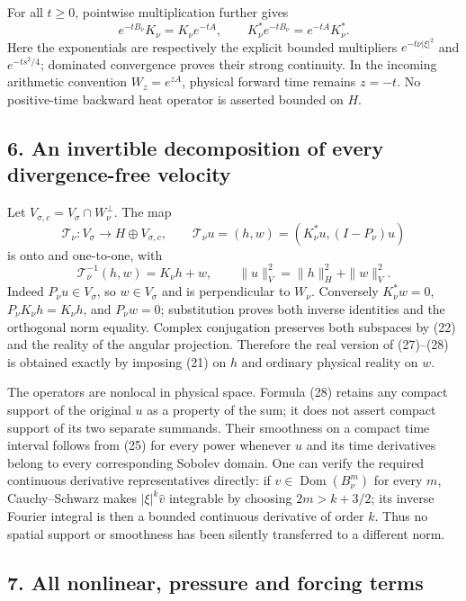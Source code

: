 For all \(t\ge0\), pointwise multiplication further gives \[
e^{-tB_\nu}K_\nu=K_\nu e^{-tA},\qquad
K_\nu^*e^{-tB_\nu}=e^{-tA}K_\nu^*.
\tag{26}
\] Here the exponentials are respectively the explicit bounded multipliers \(e^{-t\nu|\xi|^2}\) and \(e^{-ts^2/4}\); dominated convergence proves their strong continuity. In the incoming arithmetic convention \(W_z=e^{zA}\), physical forward time remains \(z=-t\). No positive-time backward heat operator is asserted bounded on \(H\).

\subsection*{6. An invertible decomposition of every divergence-free velocity}

Let \(V_{\sigma,c}=V_\sigma\cap W_\nu^\perp\). The map \[
\mathcal T_\nu:V_\sigma\longrightarrow H\oplus V_{\sigma,c},\qquad
\mathcal T_\nu u=(h,w)=(K_\nu^*u,(I-P_\nu)u)
\tag{27}
\] is onto and one-to-one, with \[
\mathcal T_\nu^{-1}(h,w)=K_\nu h+w,
\qquad\|u\|_V^2=\|h\|_H^2+\|w\|_V^2.
\tag{28}
\] Indeed \(P_\nu u\in V_\sigma\), so \(w\in V_\sigma\) and is perpendicular to \(W_\nu\). Conversely \(K_\nu^*w=0\), \(P_\nu K_\nu h=K_\nu h\), and \(P_\nu w=0\); substitution proves both inverse identities and the orthogonal norm equality. Complex conjugation preserves both subspaces by (22) and the reality of the angular projection. Therefore the real version of (27)--(28) is obtained exactly by imposing (21) on \(h\) and ordinary physical reality on \(w\).

The operators are nonlocal in physical space. Formula (28) retains any compact support of the original \(u\) as a property of the sum; it does not assert compact support of its two separate summands. Their smoothness on a compact time interval follows from (25) for every power whenever \(u\) and its time derivatives belong to every corresponding Sobolev domain. One can verify the required continuous derivative representatives directly: if \(v\in\operatorname{Dom}(B_\nu^m)\) for every \(m\), Cauchy--Schwarz makes \(|\xi|^k\widehat v\) integrable by choosing \(2m>k+3/2\); its inverse Fourier integral is then a bounded continuous derivative of order \(k\). Thus no spatial support or smoothness has been silently transferred to a different norm.

\subsection*{7. All nonlinear, pressure and forcing terms}


